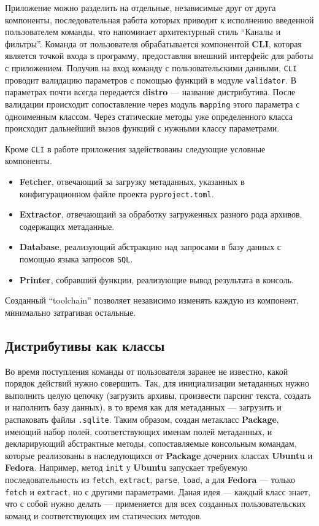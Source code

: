 Приложение можно разделить на отдельные, независимые друг от друга компоненты, последовательная работа которых приводит к исполнению введенной пользователем команды, что напоминает архитектурный стиль \enquote{Каналы и фильтры}.
Команда от пользователя обрабатывается компонентой \textbf{CLI}, которая является точкой входа в программу, предоставляя внешний интерфейс для работы с приложением.
Получив на вход команду с пользовательскими данными, \texttt{CLI} проводит валидацию параметров с помощью функций в модуле \texttt{validator}. В параметрах почти всегда передается \textbf{distro} --- название дистрибутива. После валидации происходит сопоставление через модуль \texttt{mapping} этого параметра с одноименным классом.
Через статические методы уже определенного класса происходит дальнейший вызов функций с нужными классу параметрами.

Кроме \texttt{CLI} в работе приложения задействованы следующие условные компоненты.
\begin{itemize}
	\item \textbf{Fetcher}, отвечающий за загрузку метаданных, указанных в конфигурационном файле проекта \texttt{pyproject.toml}.
	\item \textbf{Extractor}, отвечающаий за обработку загруженных разного рода архивов, содержащих метаданные.
	\item \textbf{Database}, реализующий абстракцию над запросами в базу данных с помощью языка запросов \texttt{SQL}.
	\item \textbf{Printer}, собравший функции, реализующие вывод результата в консоль.
\end{itemize}

Созданный \enquote{toolchain} позволяет независимо изменять каждую из компонент, минимально затрагивая остальные.

\subsection{Дистрибутивы как классы}
Во время поступления команды от пользователя заранее не известно, какой порядок действий нужно совершить. Так, для инициализации метаданных {\ubuntu} нужно выполнить целую цепочку (загрузить архивы, произвести парсинг текста, создать и наполнить базу данных), в то время как для метаданных {\fedora} --- загрузить и распаковать файлы \texttt{.sqlite}.
Таким образом, создан метакласс \textbf{Package}, имеющий набор полей, соответствующих именам полей метаданных, и декларирующий абстрактные методы, сопоставляемые консольным командам, которые реализованы в наследующихся от \textbf{Package} дочерних классах \textbf{Ubuntu} и \textbf{Fedora}.
Например, метод \texttt{init} у \textbf{Ubuntu} запускает требуемую последовательность из \texttt{fetch}, \texttt{extract}, \texttt{parse}, \texttt{load}, а для \textbf{Fedora} --- только \texttt{fetch} и \texttt{extract}, но с другими параметрами.
Даная идея --- каждый класс знает, что с собой нужно делать --- применяется для всех созданных пользовательских команд и соответствующих им статических методов.
